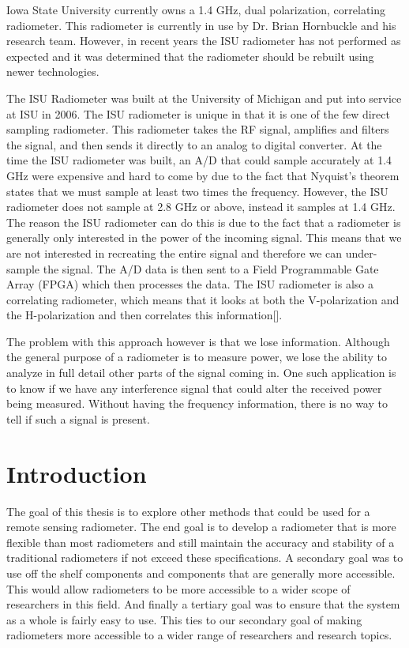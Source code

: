 Iowa State University currently owns a 1.4 GHz, dual polarization, correlating radiometer.  This radiometer is currently in use by Dr. Brian Hornbuckle and his research team.  However, in recent years the ISU radiometer has not performed as expected and it was determined that the radiometer should be rebuilt using newer technologies.  

The ISU Radiometer was built at the University of Michigan and put into service at ISU in 2006.  The ISU radiometer is unique in that it is one of the few direct sampling radiometer.  This radiometer takes the RF signal, amplifies and filters the signal, and then sends it directly to an analog to digital converter.  At the time the ISU radiometer was built, an A/D that could sample accurately at 1.4 GHz were expensive and hard to come by due to the fact that Nyquist's theorem states that we must sample at least two times the frequency.  However, the ISU radiometer does not sample at 2.8 GHz or above, instead it samples at 1.4 GHz.  The reason the ISU radiometer can do this is due to the fact that a radiometer is generally only interested in the power of the incoming signal.  This means that we are not interested in recreating the entire signal and therefore we can under-sample the signal.  The A/D data is then sent to a Field Programmable Gate Array (FPGA) which then processes the data.  The ISU radiometer is also a correlating radiometer, which means that it looks at both the V-polarization and the H-polarization and then correlates this information[\cite{Fischman2001}]. 

The problem with this approach however is that we lose information.  Although the general purpose of a radiometer is to measure power, we lose the ability to analyze in full detail other parts of the signal coming in.  One such application is to know if we have any interference signal that could alter the received power being measured.  Without having the frequency information, there is no way to tell if such a signal is present.

\section{Introduction}
The goal of this thesis is to explore other methods that could be used for a remote sensing radiometer.  The end goal is to develop a radiometer that is more flexible than most radiometers and still maintain the accuracy and stability of a traditional radiometers if not exceed these specifications.  A secondary goal was to use off the shelf components and components that are generally more accessible.  This would allow radiometers to be more accessible to a wider scope of researchers in this field.  And finally a tertiary goal was to ensure that the system as a whole is fairly easy to use.  This ties to our secondary goal of making radiometers more accessible to a wider range of researchers and research topics.

